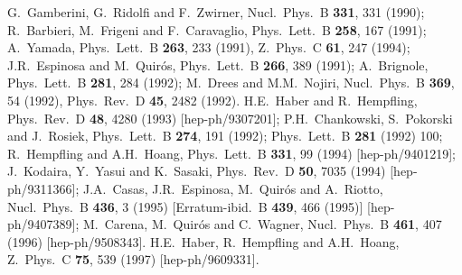 \documentclass[12pt]{article}
\begin{document}
\begin{thebibliography}{999}
G.~Gamberini, G.~Ridolfi and F.~Zwirner,
  Nucl.\ Phys.\ B {\bf 331}, 331 (1990);
R.~Barbieri, M.~Frigeni and F.~Caravaglio, 
  Phys.\ Lett.\ B {\bf 258}, 167 (1991);
A.~Yamada, 
  Phys.\ Lett.\ B {\bf 263}, 233 (1991),
  Z.\ Phys.\ C {\bf 61}, 247 (1994);
J.R.~Espinosa and M.~Quir\'os, 
  Phys.\ Lett.\ B {\bf 266}, 389 (1991);
A.~Brignole, 
  Phys.\ Lett.\ B {\bf 281}, 284 (1992);
M.~Drees and M.M.~Nojiri, 
  Nucl.\ Phys.\ B {\bf 369}, 54 (1992),
  Phys.\ Rev.\ D {\bf 45}, 2482 (1992).
H.E.~Haber and R.~Hempfling, 
  Phys.\ Rev.\ D {\bf 48}, 4280 (1993)
  [hep-ph/9307201];
P.H.~Chankowski, S.~Pokorski and J.~Rosiek,
  Phys.\ Lett.\ B {\bf 274}, 191 (1992);
  Phys.\ Lett.\ B {\bf 281} (1992) 100;
R.~Hempfling and A.H.~Hoang, 
  Phys.\ Lett.\ B {\bf 331}, 99 (1994)
  [hep-ph/9401219];
J.~Kodaira, Y.~Yasui and K.~Sasaki, 
  Phys.\ Rev.\ D {\bf 50}, 7035 (1994)
  [hep-ph/9311366];
J.A.~Casas, J.R.~Espinosa, M.~Quir\'os and A.~Riotto,
  Nucl.\ Phys.\ B {\bf 436}, 3 (1995)
  [Erratum-ibid.\ B {\bf 439}, 466 (1995)]
  [hep-ph/9407389];
M.~Carena, M.~Quir\'os and C.~Wagner, 
  Nucl.\ Phys.\ B {\bf 461}, 407 (1996)
  [hep-ph/9508343].
H.E.~Haber, R.~Hempfling and A.H.~Hoang,
  Z.\ Phys.\ C {\bf 75}, 539 (1997)
  [hep-ph/9609331].


\end{thebibliography}
\end{document}
